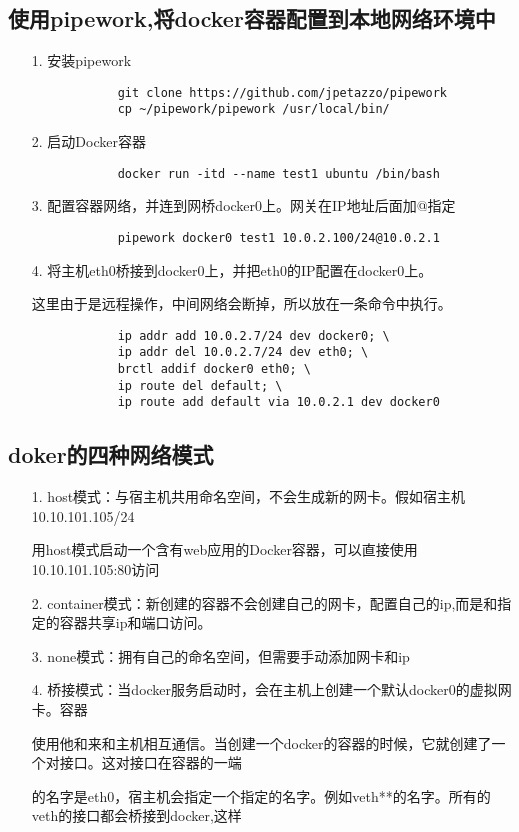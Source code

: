 \documentclass[a4paper,left=1.5cm,right=1.5cm,11pt]{article}
\begin{document}
\subsection{使用pipework,将docker容器配置到本地网络环境中}
\begin{itemize}
	\item[1.]安装pipework
		\begin{lstlisting}
			git clone https://github.com/jpetazzo/pipework
			cp ~/pipework/pipework /usr/local/bin/
		\end{lstlisting}
	\item[2.]启动Docker容器
		\begin{lstlisting}
			docker run -itd --name test1 ubuntu /bin/bash
		\end{lstlisting}
	\item[3.]配置容器网络，并连到网桥docker0上。网关在IP地址后面加@指定
		\begin{lstlisting}
			pipework docker0 test1 10.0.2.100/24@10.0.2.1
		\end{lstlisting}
	\item[4.]将主机eth0桥接到docker0上，并把eth0的IP配置在docker0上。\par
	这里由于是远程操作，中间网络会断掉，所以放在一条命令中执行。
		\begin{lstlisting}
			ip addr add 10.0.2.7/24 dev docker0; \ 
			ip addr del 10.0.2.7/24 dev eth0; \
			brctl addif docker0 eth0; \
			ip route del default; \
			ip route add default via 10.0.2.1 dev docker0
		\end{lstlisting}
	
\end{itemize}
\subsection{doker的四种网络模式}
\begin{itemize}
	\item[1.]host模式：与宿主机共用命名空间，不会生成新的网卡。假如宿主机10.10.101.105/24\par
	用host模式启动一个含有web应用的Docker容器，可以直接使用10.10.101.105:80访问
	\item[2.]container模式：新创建的容器不会创建自己的网卡，配置自己的ip,而是和指定的容器共享ip和端口访问。
	\item[3.]none模式：拥有自己的命名空间，但需要手动添加网卡和ip
	\item[4.]桥接模式：当docker服务启动时，会在主机上创建一个默认docker0的虚拟网卡。容器\par
	使用他和来和主机相互通信。当创建一个docker的容器的时候，它就创建了一个对接口。这对接口在容器的一端\par
	的名字是eth0，宿主机会指定一个指定的名字。例如veth**的名字。所有的veth的接口都会桥接到docker,这样\par
\end{itemize}
\end{document}
